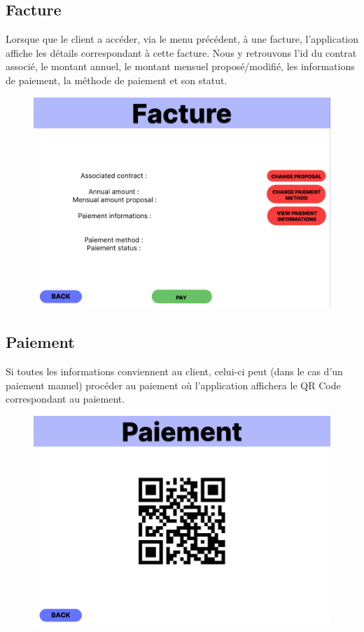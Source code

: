 \subsection{Facture}
\begin{flushleft}
Lorsque que le client a accéder, via le menu précédent, à une facture, l'application affiche les détails correspondant à cette facture. Nous y retrouvons l'id du contrat associé, le montant annuel, le montant mensuel proposé/modifié, les informations de paiement, la méthode de paiement et son statut.
\end{flushleft}
\begin{figure}[h]
\centering
\includegraphics[width = 1\textwidth]{extension-maxime/interface/img/facture.png}
\end{figure}

\subsection{Paiement}
\begin{flushleft}
Si toutes les informations conviennent au client, celui-ci peut (dans le cas d'un paiement manuel) procéder au paiement où l'application affichera le QR Code correspondant au paiement.
\end{flushleft}
\begin{figure}[h]
\centering
\includegraphics[width = 1\textwidth]{extension-maxime/interface/img/paiement.png}
\end{figure}

